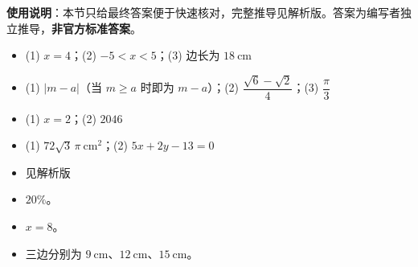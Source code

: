 
\begin{gknotice}
\textbf{使用说明}：本节只给最终答案便于快速核对，完整推导见解析版。答案为编写者独立推导，\textbf{非官方标准答案}。
\end{gknotice}

\begin{itemize}[leftmargin=2.6em]
  \item[\textbf{1.}] (1) $x=4$；(2) $-5<x<5$；(3) 边长为 $18\ \mathrm{cm}$
  \item[\textbf{2.}] (1) $|m-a|$（当 $m\ge a$ 时即为 $m-a$）；(2) $\dfrac{\sqrt6-\sqrt2}{4}$；(3) $\dfrac{\pi}{3}$
  \item[\textbf{3.}] (1) $x=2$；(2) $2046$
  \item[\textbf{4.}] (1) $72\sqrt3\,\pi\ \mathrm{cm^2}$；(2) $5x+2y-13=0$
  \item[\textbf{5.}] 见解析版
  \item[\textbf{6.}] $20\%$。
  \item[\textbf{7.}] $x=8$。
  \item[\textbf{8.}] 三边分别为 $9\ \mathrm{cm}$、$12\ \mathrm{cm}$、$15\ \mathrm{cm}$。
\end{itemize}
